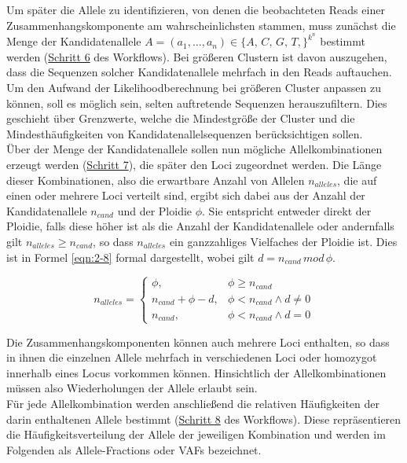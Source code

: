 Um später die Allele zu identifizieren, von denen die beobachteten Reads einer Zusammenhangskomponente am wahrscheinlichsten stammen, muss zunächst die Menge der Kandidatenallele $A=(a_{1}, \dots, a_{n}) \in \{A,\,C,\,G,\,T,\}^{k^n}$ bestimmt werden (\hyperref[step6]{Schritt 6\label{step6txt}} des Workflows). Bei größeren Clustern ist davon auszugehen, dass die Sequenzen solcher Kandidatenallele mehrfach in den Reads auftauchen. Um den Aufwand der Likelihoodberechnung bei größeren Cluster anpassen zu können, soll es möglich sein, selten auftretende Sequenzen herauszufiltern. Dies geschieht über Grenzwerte, welche die Mindestgröße der Cluster und die Mindesthäufigkeiten von Kandidatenallelsequenzen berücksichtigen sollen. \\

Über der Menge der Kandidatenallele sollen nun mögliche Allelkombinationen erzeugt werden (\hyperref[step7]{Schritt 7\label{step7txt}}), die später den Loci zugeordnet werden. Die Länge dieser Kombinationen, also die erwartbare Anzahl von Allelen $n_{alleles}$, die auf einen oder mehrere Loci verteilt sind, ergibt sich dabei aus der Anzahl der Kandidatenallele $n_{cand}$ und der Ploidie $\phi$. Sie entspricht entweder direkt der Ploidie, falls diese höher ist als die Anzahl der Kandidatenallele oder andernfalls gilt $n_{alleles} \geq n_{cand}$, so dass $n_{alleles}$ ein ganzzahliges Vielfaches der Ploidie ist. Dies ist in Formel \eqref{eqn:2-8} formal dargestellt, wobei gilt $d=n_{cand} \, mod \, \phi$.

\begin{equation} \label{eqn:2-8}
\tag{2-8}
n_{alleles} =
\left\{
\begin{array}{ll}
\phi, & \phi \geq n_{cand} \\
n_{cand} + \phi - d, & \phi < n_{cand} \wedge d \neq 0\\
n_{cand}, & \phi < n_{cand} \wedge d = 0
\end{array}
\right.
\end{equation}

Die Zusammenhangskomponenten können auch mehrere Loci enthalten, so dass in ihnen die einzelnen Allele mehrfach in verschiedenen Loci oder homozygot innerhalb eines Locus vorkommen können. Hinsichtlich der Allelkombinationen müssen also Wiederholungen der Allele erlaubt sein. \\
%
Für jede Allelkombination werden anschließend die relativen Häufigkeiten der darin enthaltenen Allele bestimmt (\hyperref[step8]{Schritt 8\label{step8txt}} des Workflows). Diese repräsentieren die Häufigkeitsverteilung der Allele der jeweiligen Kombination und werden im Folgenden als Allele-Fractions oder VAFs bezeichnet.\\

